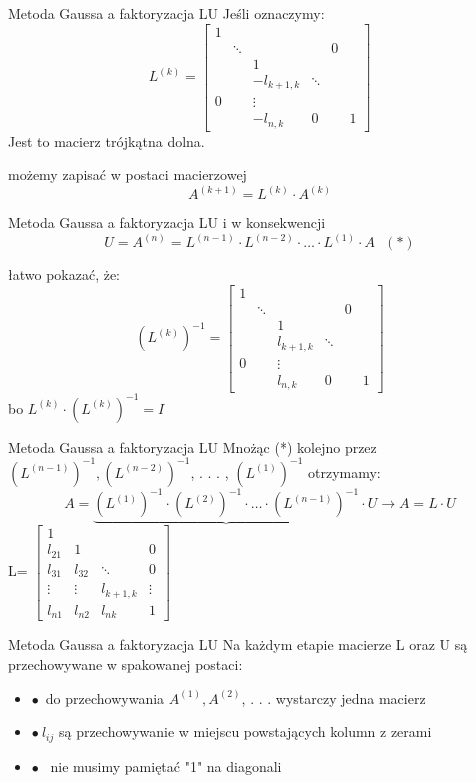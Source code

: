 \begin{frame}{Metoda Gaussa a faktoryzacja LU}
Jeśli oznaczymy:
$$
L^{(k)}=\begin{bmatrix}
1 \\
 & \ddots & & & 0 \\
 & & 1\\
 & &   -l_{k+1,k}  & \ddots\\
 0 & &  \vdots &\\
 & & -l_{n,k} &  0  & & 1

\end{bmatrix}
$$
Jest to macierz trójkątna dolna.

 możemy zapisać w postaci macierzowej
$$
A^{(k+1)}=L^{(k)}\cdot A^{(k)}
$$



\end{frame}
\begin{frame}{Metoda Gaussa a faktoryzacja LU}
i w konsekwencji
$$
U=A^{(n)}=L^{(n-1)}\cdot L^{(n-2)}\cdot\ldots\cdot L^{(1)}\cdot A \ \ \ (*)
$$

łatwo pokazać, że:
$$
(L^{(k)})^{-1}=\begin{bmatrix}
1 \\
 & \ddots & & & 0 \\
 & & 1\\
 & &   l_{k+1,k}  & \ddots\\
 0 & &  \vdots \\
 & & l_{n,k} &  0  & & 1

\end{bmatrix}
$$
bo $L^{(k)}\cdot(L^{(k)})^{-1}=I$
\end{frame}
\begin{frame}{Metoda Gaussa a faktoryzacja LU}
Mnożąc (*) kolejno przez $(L^{(n-1)})^{-1}, (L^{(n-2)})^{-1}$, . . . , $(L^{(1)})^{-1}$ otrzymamy:
$$
A=\underbrace{(L^{(1)})^{-1}\cdot(L^{(2)})^{-1}\cdot\ldots\cdot(L^{(n-1)})^{-1}}\cdot U\rightarrow A=L\cdot U
$$
\hspace{17mm}
L=
$
\begin{bmatrix}
1 & & & \\
l_{21}  & 1 & & 0 \\
l_{31} & l_{32} & \ddots & 0 \\
\vdots & \vdots & l_{k+1,k} & \vdots \\
l_{n1} & l_{n2} & l_{nk} & 1
\end{bmatrix}
$
\end{frame}
\begin{frame}{Metoda Gaussa a faktoryzacja LU}
Na każdym etapie macierze L oraz U są przechowywane w spakowanej postaci:\\
\begin{itemize}
    \item $\bullet$~do przechowywania $A^{(1)}, A^{(2)}$, . . . wystarczy jedna macierz 
    \item $\bullet~ l_{ij}$ są przechowywanie w miejscu powstających kolumn z zerami
    \item $\bullet$~ nie musimy pamiętać "1" na diagonali
\end{itemize}

 \newline

\end{frame}